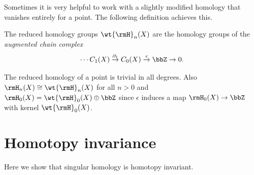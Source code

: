 Sometimes it is very helpful to work with a slightly modified homology that vanishes entirely for a point. The following definition achieves this.

\begin{defn}
    The reduced homology groups $\wt{\rmH}_n(X)$ are the homology groups of the \emph{augmented chain complex}
    \[\cdots C_1(X)\overset{\partial_1}\to C_0(X)\overset{\epsilon}\to \bbZ\to 0.\]
\end{defn}

The reduced homology of a point is trivial in all degrees. Also $\rmH_n(X)\cong \wt{\rmH}_n(X)$ for all $n>0$ and $\rmH_0(X)=\wt{\rmH}_0(X)\oplus \bbZ$ since $\epsilon$ induces a map $\rmH_0(X)\to \bbZ$ with kernel $\wt{\rmH}_0(X)$.




\section{Homotopy invariance}

Here we show that singular homology is homotopy invariant.

